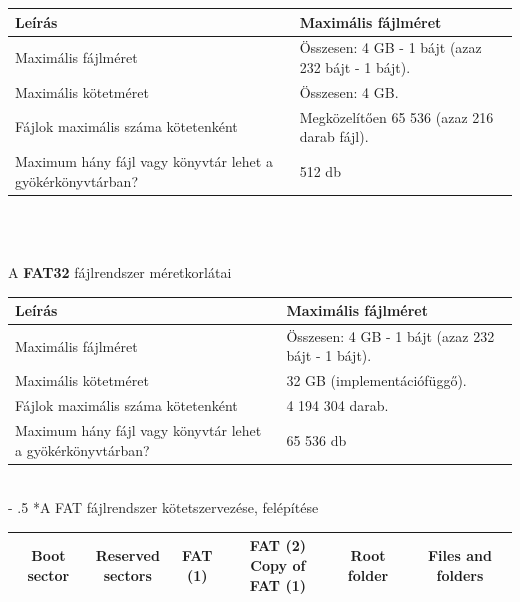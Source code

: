 \documentclass[tikz,12pt,margin=0px]{article}
\makeatletter
\renewcommand\paragraph{%
	\@startsection{paragraph}{4}{0mm}%
	{-\baselineskip}%
	{.5\baselineskip}%
	{\normalfont\normalsize\bfseries}}
\makeatother
\begin{document}
    \noindent \renewcommand{\arraystretch}{2}
    {\footnotesize
      \begin{tabular}{|p{6cm}|p{9cm}|} \hline
      Leírás & Maximális fájlméret \\ \hline \hline
      Maximális fájlméret & Összesen: 4 GB - 1 bájt (azaz 232 bájt - 1 bájt). \\ \hline
      Maximális kötetméret & Összesen: 4 GB. \\ \hline
      Fájlok maximális száma kötetenként & Megközelítően 65 536 (azaz 216 darab fájl). \\ \hline
      Maximum hány fájl vagy könyvtár lehet a gyökérkönyvtárban? & 512 db \\ \hline
      \end{tabular}\\
    }
    \renewcommand{\arraystretch}{1}\\

    \noindent A \textbf{FAT32} fájlrendszer méretkorlátai\\

    \noindent \renewcommand{\arraystretch}{2}
    {\footnotesize
      \begin{tabular}{|p{6cm}|p{9cm}|} \hline
      Leírás & Maximális fájlméret \\ \hline \hline
      Maximális fájlméret & Összesen: 4 GB - 1 bájt (azaz 232 bájt - 1 bájt). \\ \hline
      Maximális kötetméret & 32 GB (implementációfüggő). \\ \hline
      Fájlok maximális száma kötetenként & 4 194 304 darab. \\ \hline
      Maximum hány fájl vagy könyvtár lehet a gyökérkönyvtárban? & 65 536 db \\ \hline
      \end{tabular}
    }
    \renewcommand{\arraystretch}{1}\\

    \paragraph*{A FAT fájlrendszer kötetszervezése, felépítése}

        {\footnotesize
    \begin{centering}
        \noindent \renewcommand{\arraystretch}{2}
            \begin{tabular}{|c|c|c|c|c|c|} \hline
                \textbf{Boot sector} & \makecell{Reserved \\ sectors} & \textbf{FAT} (1) & \makecell{\textbf{FAT (2)}\\Copy of FAT (1)} & \textbf{Root folder} & \textbf{Files and folders} \\ \hline
            \end{tabular}
        \renewcommand{\arraystretch}{1}\\
    \end{centering}
        }
\end{document}
